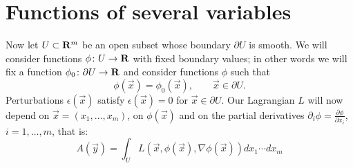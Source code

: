 \section{Functions of several variables}

Now let $U\subset\mathbf{R}^m$ be an open subset whose boundary $\partial U$ is smooth. We will consider functions $\phi\colon U\to\mathbf{R}$ with fixed boundary values; in other words we will fix a function $\phi_0\colon\partial U\to\mathbf{R}$ and consider functions $\phi$ such that
\[\phi(\vec{x})=\phi_0(\vec{x}),\qquad\vec{x}\in\partial U.\]
Perturbations $\epsilon(\vec{x})$ satisfy $\epsilon(\vec{x})=0$ for $\vec{x}\in\partial U$. Our Lagrangian $L$ will now depend on $\vec{x}=(x_1,\ldots,x_m)$, on $\phi(\vec{x})$ and on the partial derivatives $\partial_i\phi=\frac{\partial \phi}{\partial x_i}$, $i=1,\ldots,m$, that is:
\[A(\vec{y})=\int_UL\left(\vec{x},\phi(\vec{x}),\nabla\phi(\vec{x})\right)dx_1\cdots dx_m\]

